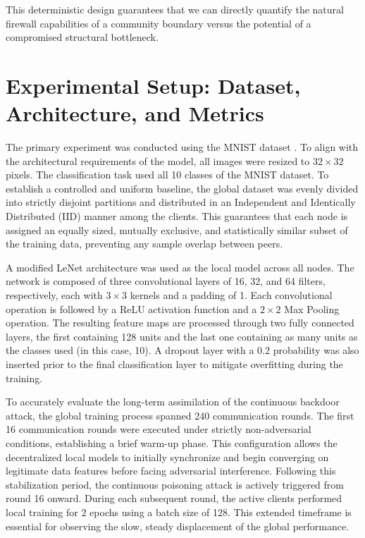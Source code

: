 This deterministic design guarantees that we can directly quantify the natural firewall capabilities of a community boundary versus the potential of a compromised structural bottleneck.


\section{Experimental Setup: Dataset, Architecture, and Metrics}

The primary experiment was conducted using the MNIST dataset \cite{lecun1998gradient}. To align with the architectural requirements of the model, all images were resized to $32 \times 32$ pixels. The classification task used all 10 classes of the MNIST dataset. To establish a controlled and uniform baseline, the global dataset was evenly divided into strictly disjoint partitions and distributed in an Independent and Identically Distributed (IID) manner among the clients. This guarantees that each node is assigned an equally sized, mutually exclusive, and statistically similar subset of the training data, preventing any sample overlap between peers.

A modified LeNet \cite{lecun1998gradient} architecture was used as the local model across all nodes. The network is composed of three convolutional layers of 16, 32, and 64 filters, respectively, each with $3 \times 3$ kernels and a padding of 1. Each convolutional operation is followed by a ReLU activation function and a $2 \times 2$ Max Pooling operation. The resulting feature maps are processed through two fully connected layers, the first containing 128 units and the last one containing as many units as the classes used (in this case, 10). A dropout layer with a 0.2 probability was also inserted prior to the final classification layer to mitigate overfitting during the training.

To accurately evaluate the long-term assimilation of the continuous backdoor attack, the global training process spanned 240 communication rounds. The first 16 communication rounds were executed under strictly non-adversarial conditions, establishing a brief warm-up phase. This configuration allows the decentralized local models to initially synchronize and begin converging on legitimate data features before facing adversarial interference. Following this stabilization period, the continuous poisoning attack is actively triggered from round 16 onward. During each subsequent round, the active clients performed local training for 2 epochs using a batch size of 128. This extended timeframe is essential for observing the slow, steady displacement of the global performance.

